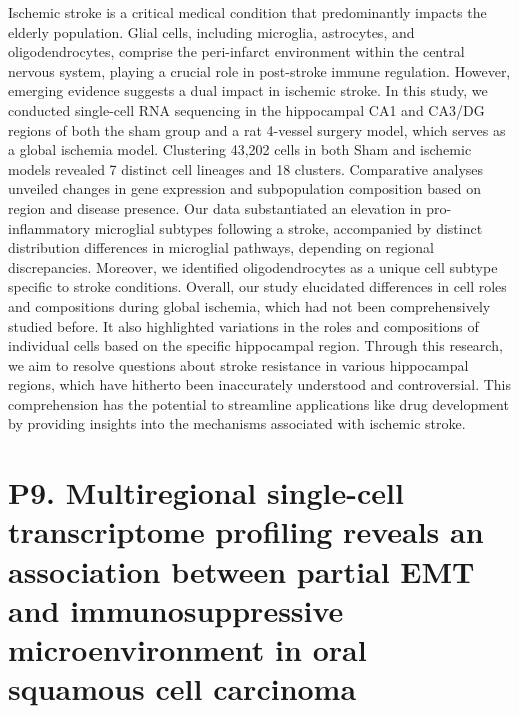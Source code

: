 \noindent
Ischemic stroke is a critical medical condition that predominantly impacts the elderly population. Glial cells, including microglia, astrocytes, and oligodendrocytes, comprise the peri-infarct environment within the central nervous system, playing a crucial role in post-stroke immune regulation. However, emerging evidence suggests a dual impact in ischemic stroke. In this study, we conducted single-cell RNA sequencing in the hippocampal CA1 and CA3/DG regions of both the sham group and a rat 4-vessel surgery model, which serves as a global ischemia model. Clustering 43,202 cells in both Sham and ischemic models revealed 7 distinct cell lineages and 18 clusters. Comparative analyses unveiled changes in gene expression and subpopulation composition based on region and disease presence. Our data substantiated an elevation in pro-inflammatory microglial subtypes following a stroke, accompanied by distinct distribution differences in microglial pathways, depending on regional discrepancies. Moreover, we identified oligodendrocytes as a unique cell subtype specific to stroke conditions. Overall, our study elucidated differences in cell roles and compositions during global ischemia, which had not been comprehensively studied before. It also highlighted variations in the roles and compositions of individual cells based on the specific hippocampal region. Through this research, we aim to resolve questions about stroke resistance in various hippocampal regions, which have hitherto been inaccurately understood and controversial. This comprehension has the potential to streamline applications like drug development by providing insights into the mechanisms associated with ischemic stroke.
\newpage

\section*{P9. Multiregional single-cell transcriptome profiling reveals an association between partial EMT and immunosuppressive microenvironment in oral squamous cell carcinoma}

